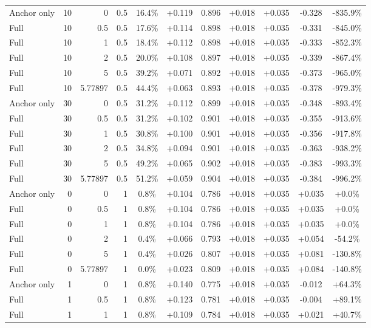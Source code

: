 \begin{table}[htbp]
\begin{tabular}{lrrrccccccc}
Anchor only & 10 & 0 & 0.5 & 16.4\% & +0.119 & 0.896 & +0.018 & +0.035 & -0.328 & -835.9\% \\
Full & 10 & 0.5 & 0.5 & 17.6\% & +0.114 & 0.898 & +0.018 & +0.035 & -0.331 & -845.0\% \\
Full & 10 & 1 & 0.5 & 18.4\% & +0.112 & 0.898 & +0.018 & +0.035 & -0.333 & -852.3\% \\
Full & 10 & 2 & 0.5 & 20.0\% & +0.108 & 0.897 & +0.018 & +0.035 & -0.339 & -867.4\% \\
Full & 10 & 5 & 0.5 & 39.2\% & +0.071 & 0.892 & +0.018 & +0.035 & -0.373 & -965.0\% \\
Full & 10 & 5.77897 & 0.5 & 44.4\% & +0.063 & 0.893 & +0.018 & +0.035 & -0.378 & -979.3\% \\
Anchor only & 30 & 0 & 0.5 & 31.2\% & +0.112 & 0.899 & +0.018 & +0.035 & -0.348 & -893.4\% \\
Full & 30 & 0.5 & 0.5 & 31.2\% & +0.102 & 0.901 & +0.018 & +0.035 & -0.355 & -913.6\% \\
Full & 30 & 1 & 0.5 & 30.8\% & +0.100 & 0.901 & +0.018 & +0.035 & -0.356 & -917.8\% \\
Full & 30 & 2 & 0.5 & 34.8\% & +0.094 & 0.901 & +0.018 & +0.035 & -0.363 & -938.2\% \\
Full & 30 & 5 & 0.5 & 49.2\% & +0.065 & 0.902 & +0.018 & +0.035 & -0.383 & -993.3\% \\
Full & 30 & 5.77897 & 0.5 & 51.2\% & +0.059 & 0.904 & +0.018 & +0.035 & -0.384 & -996.2\% \\
Anchor only & 0 & 0 & 1 & 0.8\% & +0.104 & 0.786 & +0.018 & +0.035 & +0.035 & +0.0\% \\
Full & 0 & 0.5 & 1 & 0.8\% & +0.104 & 0.786 & +0.018 & +0.035 & +0.035 & +0.0\% \\
Full & 0 & 1 & 1 & 0.8\% & +0.104 & 0.786 & +0.018 & +0.035 & +0.035 & +0.0\% \\
Full & 0 & 2 & 1 & 0.4\% & +0.066 & 0.793 & +0.018 & +0.035 & +0.054 & -54.2\% \\
Full & 0 & 5 & 1 & 0.4\% & +0.026 & 0.807 & +0.018 & +0.035 & +0.081 & -130.8\% \\
Full & 0 & 5.77897 & 1 & 0.0\% & +0.023 & 0.809 & +0.018 & +0.035 & +0.084 & -140.8\% \\
Anchor only & 1 & 0 & 1 & 0.8\% & +0.140 & 0.775 & +0.018 & +0.035 & -0.012 & +64.3\% \\
Full & 1 & 0.5 & 1 & 0.8\% & +0.123 & 0.781 & +0.018 & +0.035 & -0.004 & +89.1\% \\
Full & 1 & 1 & 1 & 0.8\% & +0.109 & 0.784 & +0.018 & +0.035 & +0.021 & +40.7\% \\

\end{tabular}
\end{table}
